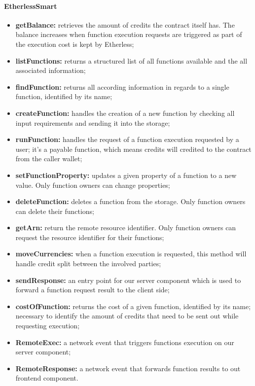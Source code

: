 \paragraph{EtherlessSmart}
\begin{itemize}
	\item \textbf{getBalance:} retrieves the amount of credits the contract itself has. The balance increases when function execution requests are triggered as part of the execution cost is kept by Etherless;
	\item \textbf{listFunctions:} returns a structured list of all functions available and the all associated information;
	\item \textbf{findFunction:} returns all according information in regards to a single function, identified by its name;
	\item \textbf{createFunction:} handles the creation of a new function by checking all input requirements and sending it into the storage;
	\item \textbf{runFunction:} handles the request of a function execution requested by a user; it's a payable function, which means credits will credited to the contract from the caller wallet;
	\item \textbf{setFunctionProperty:} updates a given property of a function to a new value. Only function owners can change properties;
	\item \textbf{deleteFunction:} deletes a function from the storage. Only function owners can delete their functions;
	\item \textbf{getArn:} return the remote resource identifier. Only function owners can request the resource identifier for their functions;
	\item \textbf{moveCurrencies:} when a function execution is requested, this method will handle credit split between the involved parties;
	\item \textbf{sendResponse:} an entry point for our server component which is used to forward a function request result to the client side;
	\item \textbf{costOfFunction:} returns the cost of a given function, identified by its name; necessary to identify the amount of credits that need to be sent out while requesting execution;
	\item \textbf{RemoteExec:} a network event that triggers functions execution on our server component;
	\item \textbf{RemoteResponse:} a network event that forwards function results to out frontend component.
\end{itemize}
